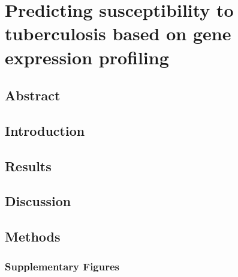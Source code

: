 \chapter{Predicting susceptibility to tuberculosis based on gene expression profiling}\label{ch:comp}

\section[Abstract]{Abstract\footnotemark}



\section{Introduction}\label{ch03-introduction}

\section{Results}


\section{Discussion}


\section{Methods}



\clearpage


\subsection{Supplementary Figures}\label{ch03-supplementary-figures}

